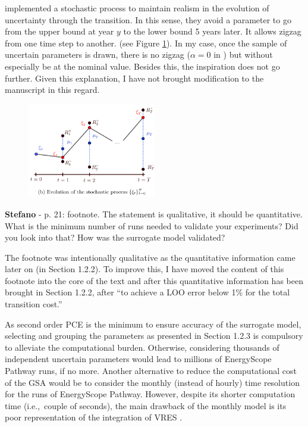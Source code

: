 \documentclass[12pt,a4paper]{article}
\def\ie{i.e.,\ }
\begin{document}
\noindent \citet{guevara2022modeling} implemented a stochastic process to maintain realism in the evolution of uncertainty through the transition. In this sense, they avoid a parameter to go from the upper bound at year $y$ to the lower bound 5 years later. It allows zigzag from one time step to another. (see Figure \ref{fig:Guevara}). In my case, once the sample of uncertain parameters is drawn, there is no zigzag ($\alpha=0$ in \cite{guevara2022modeling}) but without especially be at the nominal value. Besides this, the inspiration does not go further. Given this explanation, I have not brought modification to the manuscript in this regard.

\begin{figure}[htbp!]
\centering
\includegraphics[width=0.5\textwidth]{Guevara.png}
\label{fig:Guevara}
\end{figure}

\begin{mdframed}[style=comment] %
{\color{orange} \textbf{Stefano}} - p. 21: footnote. The statement is qualitative, it should be quantitative. What is the minimum number of runs needed to validate your experiments? Did you look into that? How was the surrogate model validated?
\end{mdframed}

\noindent The footnote was intentionally qualitative as the quantitative information came later on (in Section 1.2.2). To improve this, I have moved the content of this footnote into the core of the text and after this quantitative information has been brought {\color{blue}in Section 1.2.2, after ``to achieve a LOO error below 1\% for the total transition cost.''}

\begin{mdframed}[style=manuscript] %
As second order PCE is the minimum to ensure accuracy of the surrogate model, selecting and grouping the parameters as presented in Section 1.2.3 is compulsory to alleviate the computational burden. Otherwise, considering thousands of independent uncertain parameters would lead to millions of EnergyScope Pathway runs, if no more. Another alternative to reduce the computational cost of the GSA would be to consider the monthly (instead of hourly) time resolution for the runs of EnergyScope Pathway. However, despite its shorter computation time (\ie couple of seconds), the main drawback of the monthly model is its poor representation of the integration of VRES \cite{limpens2024pathway}. 

\end{mdframed}
\end{document}
